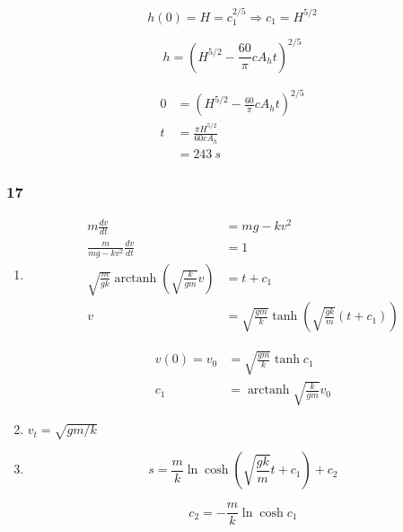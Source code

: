 \documentclass{article}
\DeclareMathOperator{\arctanh}{arctanh}
\begin{document}
\begin{enumerate}
        \[h(0) = H = c_1^{2 / 5} \Rightarrow c_1 = H^{5 / 2}\]

        \[h = \left( H^{5 / 2} - \frac{60}{\pi} c A_h t \right)^{2 / 5}\]

        \begin{align*}
          0 & = \left( H^{5 / 2} - \frac{60}{\pi} c A_h t \right)^{2 / 5} \\
          t & = \frac{\pi H^{5 / 2}}{60 c A_h}                            \\
            & = \qty{243}{s}
        \end{align*}
\end{enumerate}

\subsubsection{17}

\begin{enumerate}
  \item

        \begin{align*}
          m \frac{dv}{dt}                                                     & = m g - k v^2                                                              \\
          \frac{m}{m g - k v^2} \frac{dv}{dt}                                 & = 1                                                                        \\
          \sqrt{\frac{m}{g k}} \arctanh \left( \sqrt{\frac{k}{g m}} v \right) & = t + c_1                                                                  \\
          v                                                                   & = \sqrt{\frac{g m}{k}} \tanh \left( \sqrt{\frac{g k}{m}} (t + c_1) \right)
        \end{align*}

        \begin{align*}
          v(0) = v_0 & = \sqrt{\frac{g m}{k}} \tanh c_1   \\
          c_1        & = \arctanh \sqrt{\frac{k}{gm}} v_0
        \end{align*}

  \item $v_t = \sqrt{g m / k}$

  \item

        \[s = \frac{m}{k} \ln \cosh \left( \sqrt{\frac{g k}{m}} t + c_1 \right) + c_2\]

        \[c_2 = -\frac{m}{k} \ln \cosh c_1\]
\end{enumerate}
\end{document}
